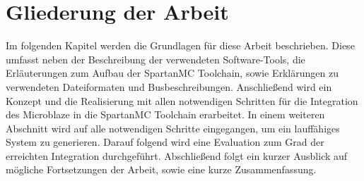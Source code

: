 \section{Gliederung der Arbeit}
Im folgenden Kapitel werden die Grundlagen für diese Arbeit beschrieben. Diese umfasst neben der Beschreibung der verwendeten Software-Tools, die Erläuterungen zum
Aufbau der SpartanMC Toolchain, sowie Erklärungen zu verwendeten Dateiformaten und Busbeschreibungen. Anschließend wird ein Konzept und die Realisierung mit allen notwendigen Schritten 
für die Integration des Microblaze in die SpartanMC Toolchain erarbeitet. In einem weiteren 
Abschnitt wird auf alle notwendigen Schritte eingegangen, um ein lauffähiges System zu generieren. Darauf folgend wird eine Evaluation zum Grad der erreichten Integration
durchgeführt. Abschließend folgt ein kurzer Ausblick auf mögliche Fortsetzungen der Arbeit, sowie eine kurze Zusammenfassung.

